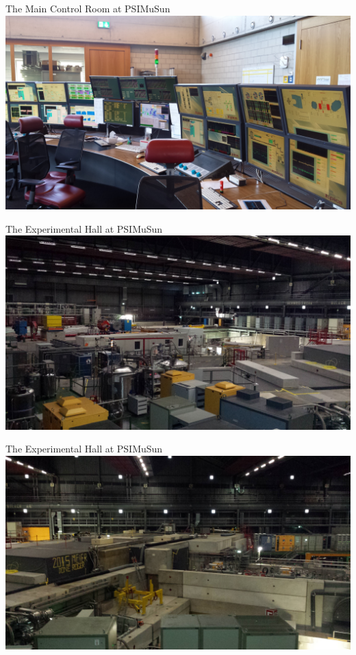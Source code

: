 \documentclass{beamer}
\begin{document}
\begin{frame}{The Main Control Room at PSI}{MuSun}
  \includegraphics[width=\textwidth]{figures/control_room.jpg}\\
\end{frame}

\begin{frame}{The Experimental Hall at PSI}{MuSun}
  \includegraphics[width=\textwidth]{figures/hall.jpg}\\
\end{frame}

\begin{frame}{The Experimental Hall at PSI}{MuSun}
  \includegraphics[width=\textwidth]{figures/hall_2.jpg}\\
\end{frame}
\end{document}
